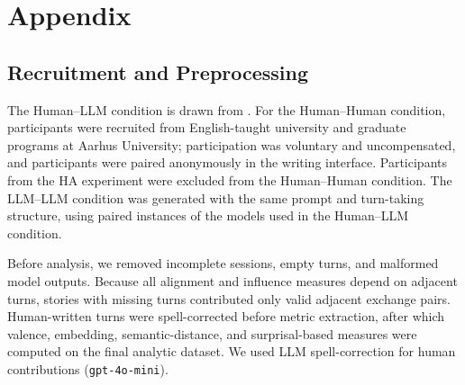 \documentclass[11pt]{article}
\begin{document}

%


\appendix

\section{Appendix}
\label{sec:appendix}

\subsection{Recruitment and Preprocessing}

The Human--LLM condition is drawn from \citet{fundal2026directionalalignmentnarrativeagency}. For the Human--Human condition, participants were recruited from English-taught university and graduate programs at Aarhus University; participation was voluntary and uncompensated, and participants were paired anonymously in the writing interface. Participants from the HA experiment were excluded from the Human--Human condition. The LLM--LLM condition was generated with the same prompt and turn-taking structure, using paired instances of the models used in the Human--LLM condition.

Before analysis, we removed incomplete sessions, empty turns, and malformed model outputs. Because all alignment and influence measures depend on adjacent turns, stories with missing turns contributed only valid adjacent exchange pairs. Human-written turns were spell-corrected before metric extraction, after which valence, embedding, semantic-distance, and surprisal-based measures were computed on the final analytic dataset. We used LLM spell-correction for human contributions (\texttt{gpt-4o-mini}). 
\end{document}
